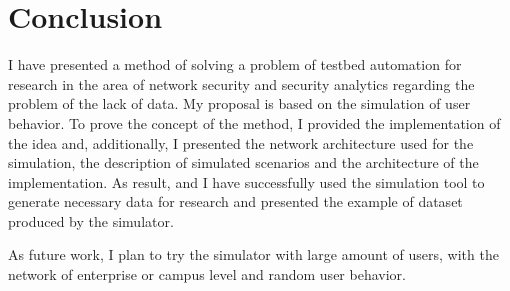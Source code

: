 
\section{Conclusion}

I have presented a method of solving a problem of testbed automation for research in the area of network security and security analytics regarding the problem of the lack of data. My proposal is based on the simulation of user behavior. To prove the concept of the method, I provided the implementation of the idea and, additionally, I presented the network architecture used for the simulation, the description of simulated scenarios and the architecture of the implementation. As result, and I have successfully used the simulation tool to generate necessary data for research and presented the example of dataset produced by the simulator.

As future work, I plan to try the simulator with large amount of users, with the network of enterprise or campus level and random user behavior.